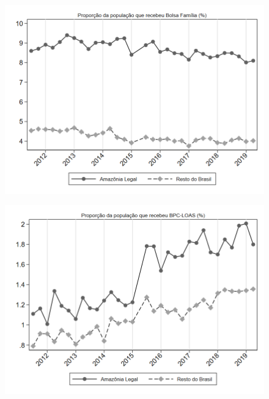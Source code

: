 \begin{frame}[label=_programas_sociais_prop_bolsa_familia]{}
\textit{\hyperlink{_programas_sociais}{}}
\begin{figure}
  \centering
  \includegraphics[width=1.0\linewidth]{../../analysis/output/programas_sociais/_programas_sociais_prop_bolsa_familia.png}
  \caption{}
  \label{fig:_programas_sociais_prop_bolsa_familia}
\end{figure}
\end{frame}

\begin{frame}[label=_programas_sociais_prop_bpc_loas]{}
\textit{\hyperlink{_programas_sociais}{}}
\begin{figure}
  \centering
  \includegraphics[width=1.0\linewidth]{../../analysis/output/programas_sociais/_programas_sociais_prop_bpc_loas.png}
  \caption{}
  \label{fig:_programas_sociais_prop_bpc_loas}
\end{figure}
\end{frame}
